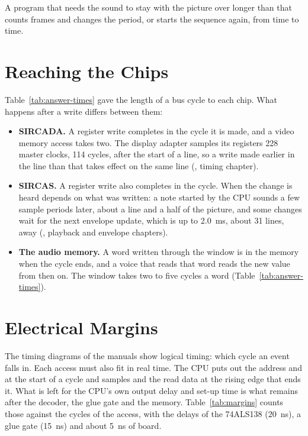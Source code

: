 \noindent A program that needs the sound to stay with the picture over longer than that counts frames and changes the
period, or starts the sequence again, from time to time.

\section{Reaching the Chips}
\label{sec:reaching}

Table~\ref{tab:answer-times} gave the length of a bus cycle to each chip. What happens after a write differs between
them:

\begin{itemize}
	\item \textbf{SIRCADA.} A register write completes in the cycle it is made, and a video memory access takes two. The display adapter samples its registers
	      228 master clocks, 114 cycles, after the start of a line, so a write made earlier in the line than that takes
	      effect on the same line (\videomanual{}, timing chapter).
	\item \textbf{SIRCAS.} A register write also completes in the cycle. When the change is heard depends on what was
	      written: a note started by the CPU sounds a few sample periods later, about a line and a half of the picture,
	      and some changes wait for the next envelope update, which is up to 2.0~ms, about 31 lines, away
	      (\audiomanual{}, playback and envelope chapters).
	\item \textbf{The audio memory.} A word written through the window is in the memory when the cycle ends, and a
	      voice that reads that word reads the new value from then on. The window takes two to five cycles a word
	      (Table~\ref{tab:answer-times}).
\end{itemize}

\section{Electrical Margins}
\label{sec:margins}

The timing diagrams of the manuals show logical timing: which cycle an event falls in. Each access must also fit in
real time. The CPU puts out the address and  at the start of a cycle and samples  and
the read data at the rising edge that ends it. What is left for the CPU's own output delay and set-up time is what
remains after the decoder, the glue gate and the memory. Table~\ref{tab:margins} counts those against the cycles of the
access, with the delays of the 74ALS138 (20~ns), a glue gate (15~ns) and about 5~ns of board.

